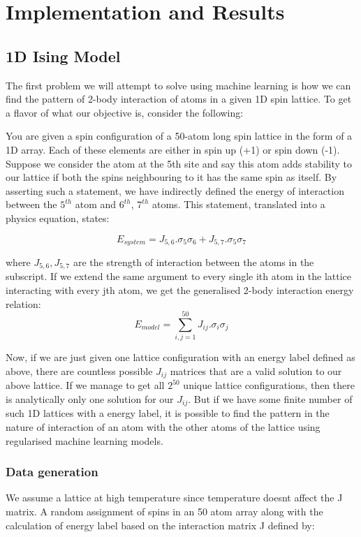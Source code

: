\section{Implementation and Results}

\subsection{1D Ising Model}

The first problem we will attempt to solve using machine learning is how we can find the pattern of 2-body interaction of atoms in a given 1D spin lattice.
To get a flavor of what our objective is, consider the following:

You are given a spin configuration of a 50-atom long spin lattice in the form of a 1D array.
Each of these elements are either in spin up (+1) or spin down (-1).
Suppose we consider the atom at the 5th site and say this atom adds stability to our lattice if both the spins neighbouring to it has the same spin as itself.
By asserting such a statement, we have indirectly defined the energy of interaction between the $5^{th}$ atom and $6^{th}$, $7^{th}$ atoms.
This statement, translated into a physics equation, states:

\[ E_{system}=J_{5,6}.\sigma_5\sigma_6+J_{5,7}.\sigma_5\sigma_7\]

where \(J_{5,6}, J_{5,7}\) are the strength of interaction between the atoms in the subscript.
If we extend the same argument to every single ith atom in the lattice interacting with every jth atom, we get the generalised 2-body interaction energy relation: \[E_{model}=\sum_{i,j=1}^{50}J_{ij}.\sigma_i\sigma_j\]

Now, if we are just given one lattice configuration with an energy label defined as above, there are countless possible \(J_{ij}\) matrices that are a valid solution to our above lattice.
If we manage to get all \(2^{50}\) unique lattice configurations, then there is analytically only one solution for our \(J_{ij}\).
But if we have some finite number of such 1D lattices with a energy label, it is possible to find the pattern in the nature of interaction of an atom with the other atoms of the lattice using regularised machine learning models.

\subsubsection{Data generation}

We assume a lattice at high temperature since temperature doesnt affect the J matrix.
A random assignment of spins in an 50 atom array along with the calculation of energy label based on the interaction matrix J defined by:

